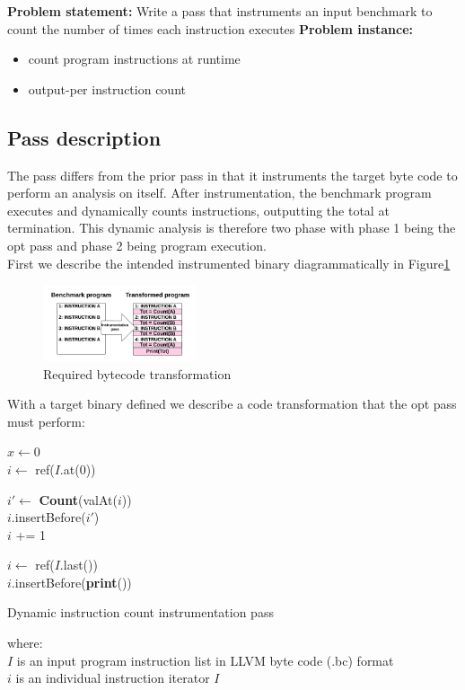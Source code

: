 \documentclass[letterpaper,twocolumn,10pt]{article}
\begin{document}
\textbf{Problem statement: }Write a pass that instruments an input benchmark to count the number of times each instruction executes
\textbf{Problem instance: }
\begin{itemize}
\item count program instructions at runtime
\item output-per instruction count
\end{itemize}

\subsection{Pass description}
The pass differs from the prior pass in that it instruments the target byte code to perform an analysis on itself. After instrumentation, the benchmark program executes and dynamically counts instructions, outputting the total at termination. This dynamic analysis is therefore two phase with phase 1 being the opt pass and phase 2 being program execution.\\
First we describe the intended instrumented binary diagrammatically in Figure\ref{Part2transform}\\

\begin{figure}[here]
\includegraphics[width=0.4\textwidth]{CompilersProj1Part2Diag.png}
\caption{Required bytecode transformation}
\label{Part2transform}
\end{figure}

With a target binary defined we describe a code transformation that the opt pass must perform:
\begin{algorithm}
 $x \gets 0$\\
 $i \gets$ ref($I$.at(0)) \\
 { 
 	
 	$i' \gets$ \textbf{Count}(valAt($i$))\\ 
 	$i$.insertBefore($i'$)\\
 	$i$ += 1\\
 }
 $i \gets$ ref($I$.last())\\
 $i$.insertBefore(\textbf{print}())

 \caption{Dynamic instruction count instrumentation pass}
\end{algorithm}
where:\\
$I$ is an input program instruction list in LLVM byte code (.bc) format\\
$i$ is an individual instruction iterator $I$\\
\end{document}
